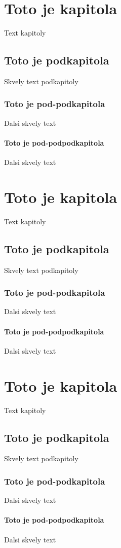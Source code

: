 \documentclass{book}
\begin{document}
\tableofcontents

\chapter{Toto je kapitola}
Text kapitoly

\section{Toto je podkapitola}
Skvely text podkapitoly

\subsection{Toto je pod-podkapitola}
Dalsi skvely text

\subsubsection{Toto je pod-podpodkapitola}
Dalsi skvely text

\chapter{Toto je kapitola}
Text kapitoly

\section{Toto je podkapitola}
Skvely text podkapitoly

\subsection{Toto je pod-podkapitola}
Dalsi skvely text

\subsubsection{Toto je pod-podpodkapitola}
Dalsi skvely text

\chapter{Toto je kapitola}
Text kapitoly

\section{Toto je podkapitola}
Skvely text podkapitoly

\subsection{Toto je pod-podkapitola}
Dalsi skvely text

\subsubsection{Toto je pod-podpodkapitola}
Dalsi skvely text
\end{document}
